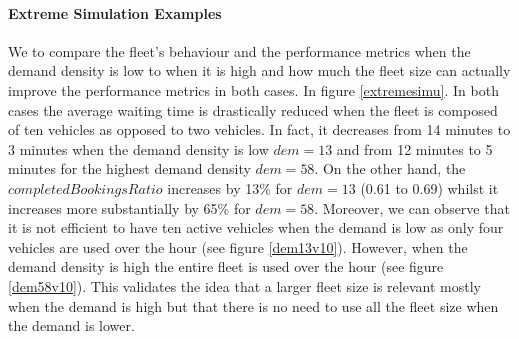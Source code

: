 \documentclass[12pt,a4paper]{article}
\begin{document}
\paragraph{Extreme Simulation Examples}
We to compare the fleet's behaviour and the performance metrics when the demand density is low to when it is high and how much the fleet size can actually improve the performance metrics in both cases. In figure \ref{extremesimu}. In both cases the average waiting time is drastically reduced when the fleet is composed of ten vehicles as opposed to two vehicles. In fact, it decreases from 14 minutes to 3 minutes when the demand density is low $dem=13$ and from 12 minutes to 5 minutes for the highest demand density $dem = 58$. On the other hand, the $completedBookingsRatio$ increases by 13\% for $dem = 13$ (0.61 to 0.69) whilst it increases more substantially by 65\% for $dem = 58$. Moreover, we can observe that it is not efficient to have ten active vehicles when the demand is low as only four vehicles are used over the hour (see figure \ref{dem13v10}). However, when the demand density is high the entire fleet is used over the hour (see figure \ref{dem58v10}). This validates the idea that a larger fleet size is relevant mostly when the demand is high but that there is no need to use all the fleet size when the demand is lower.
\end{document}
